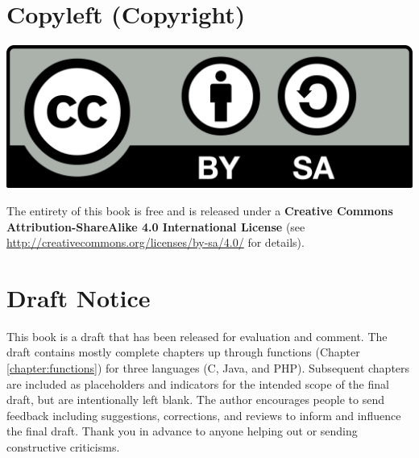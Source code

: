 \documentclass[12pt]{scrbook}
\begin{document}


\frontmatter

\chapter{Copyleft (Copyright)}

\includegraphics[scale=0.10]{images/CC-BY-SA_icon-large.png} 

The entirety of this book is free and is released under a \textbf{Creative Commons Attribution-ShareAlike 
4.0 International License} (see \url{http://creativecommons.org/licenses/by-sa/4.0/} for details).

\chapter{Draft Notice}

This book is a draft that has been released for evaluation and comment.  The
draft contains mostly complete chapters up through functions (Chapter \ref{chapter:functions}) 
for three languages (C, Java, and PHP).  Subsequent chapters are included as
placeholders and indicators for the intended scope of the final draft, but are intentionally
left blank.  The author encourages people to send feedback including suggestions, 
corrections, and reviews to inform and influence the final draft.  Thank you in advance
to anyone helping out or sending constructive criticisms.
\end{document}
